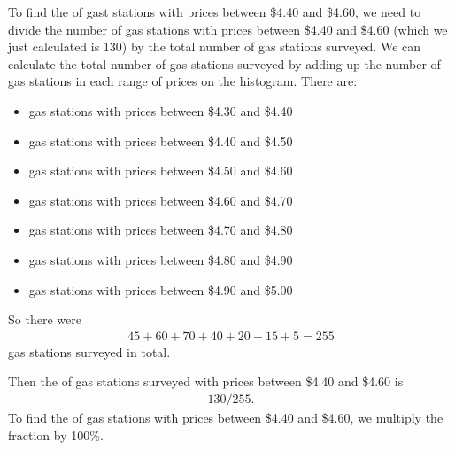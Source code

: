 \documentclass[letterpaper,10pt,english]{jupyterBook}
\begin{document}
\sphinxAtStartPar
To find the  of gast stations with prices between \$4.40 and \$4.60, we need to divide the number of gas stations with prices between \$4.40 and \$4.60 (which we just calculated is 130) by the total number of gas stations surveyed. We can calculate the total number of gas stations surveyed by adding up the number of gas stations in each range of prices on the histogram. There are:
\begin{itemize}
\item {} 
 gas stations with prices between \$4.30 and \$4.40

\item {} 
 gas stations with prices between \$4.40 and \$4.50

\item {} 
 gas stations with prices between \$4.50 and \$4.60

\item {} 
 gas stations with prices between \$4.60 and \$4.70

\item {} 
 gas stations with prices between \$4.70 and \$4.80

\item {} 
 gas stations with prices between \$4.80 and \$4.90

\item {} 
 gas stations with prices between \$4.90 and \$5.00

\end{itemize}

\sphinxAtStartPar
So there were
\begin{equation*}
\begin{split}45 + 60 + 70 + 40 + 20 + 15 + 5 = 255\end{split}
\end{equation*}
\sphinxAtStartPar
gas stations surveyed in total.

\sphinxAtStartPar
Then the  of gas stations surveyed with prices between \$4.40 and \$4.60 is
\begin{equation*}
\begin{split} 130/255. \end{split}
\end{equation*}
\sphinxAtStartPar
To find the  of gas stations with prices between \$4.40 and \$4.60, we multiply the fraction by 100\%.
\end{document}
